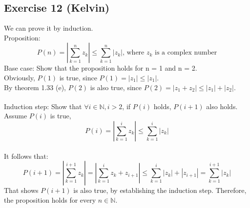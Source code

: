 \subsection*{Exercise 12 (Kelvin)}
We can prove it by induction. \\
Proposition:
\[P(n) = |\sum_{k = 1}^{n} z_{k}| \le \sum_{k=1}^{n}|z_{k}| \text{, where $z_{k}$ is a complex number}\]
Base case: Show that the proposition holds for n = 1 and n = 2. \\

Obviously, $P(1)$ is true, since $P(1) = |z_{1}| \le |z_{1}|$. \\ 

By theorem 1.33 (e), $P(2)$ is also true, since $P(2) = |z_{1} + z_{2}| \le |z_{1}| + |z_{2}|$. \\ \\
Induction step: Show that $\forall i \in \mathbb{N}, i > 2$, if $P(i)$ holds, $P(i + 1)$ also holds. \\

Assume $P(i)$ is true, \[P(i) = |\sum_{k = 1}^{i} z_{k}| \le \sum_{k=1}^{i}|z_{k}|\] \\

It follows that: \[P(i + 1) = |\sum_{k = 1}^{i + 1} z_{k}| = |\sum_{k = 1}^{i} z_{k} + z_{i+1}| \le \sum_{k=1}^{i}|z_{k}| + |z_{i + 1}| = \sum_{k=1}^{i + 1}|z_{k}|\]
That shows $P(i + 1)$ is also true, by establishing the induction step.
Therefore, the proposition holds for every $n \in \mathbb{N}$.

